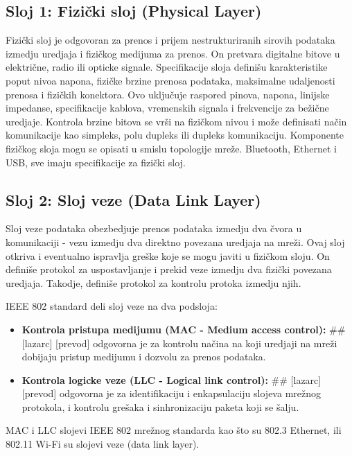 \documentclass[a4paper,12pt, master]{etf}
\begin{document}
	\subsection{Sloj 1: Fizi\v{c}ki sloj (Physical Layer)}

	Fizi\v{c}ki sloj je odgovoran za prenos i prijem nestrukturiranih sirovih podataka izmedju
	uredjaja i fizi\v{c}kog medijuma za prenos. On pretvara digitalne bitove u elektri\v{c}ne, radio
	ili opticke signale. Specifikacije sloja defini\v{s}u karakteristike poput nivoa napona,
	fizi\v{c}ke brzine prenosa podataka, maksimalne udaljenosti prenosa i fizi\v{c}kih konektora. Ovo
	uklju\v{c}uje raspored pinova, napona, linijske impedanse, specifikacije kablova, vremenskih
	signala i frekvencije za be\v{z}i\v{c}ne uredjaje. Kontrola brzine bitova se vr\v{s}i na fizi\v{c}kom
	nivou i mo\v{z}e definisati na\v{c}in komunikacije kao simpleks, polu dupleks ili dupleks
	komunikaciju. Komponente fizi\v{c}kog sloja mogu se opisati u smislu topologije mre\v{z}e.
	Bluetooth, Ethernet i USB, sve imaju specifikacije za fizi\v{c}ki sloj.

	\subsection{Sloj 2: Sloj veze (Data Link Layer)}

	Sloj veze podataka obezbedjuje prenos podataka izmedju dva \v{c}vora u komunikaciji - vezu
	izmedju dva direktno povezana uredjaja na mre\v{z}i. Ovaj sloj otkriva i eventualno ispravlja
	gre\v{s}ke koje se mogu javiti u fizi\v{c}kom sloju. On defini\v{s}e protokol za uspostavljanje i
	prekid veze izmedju dva fizi\v{c}ki povezana uredjaja. Takodje, defini\v{s}e protokol za kontrolu
	protoka izmedju njih.

	IEEE 802 standard deli sloj veze na dva podsloja:
	\begin{itemize}
		\item \textbf{Kontrola pristupa medijumu (MAC - Medium access control):}
		\#\# [lazarc] [prevod]
		odgovorna je za kontrolu na\v{c}ina na koji uredjaji na mre\v{z}i dobijaju pristup medijumu i
		dozvolu za prenos podataka.
		\item \textbf{Kontrola logicke veze (LLC - Logical link control):}
		\#\# [lazarc] [prevod]
		odgovorna je za identifikaciju i enkapsulaciju slojeva mre\v{z}nog protokola, i kontrolu
		gre\v{s}aka i sinhronizaciju paketa koji se \v{s}alju.
	\end{itemize}

	MAC i LLC slojevi IEEE 802 mre\v{z}nog standarda kao \v{s}to su 802.3 Ethernet, ili 802.11 Wi-Fi su
	slojevi veze (data link layer).
\end{document}
